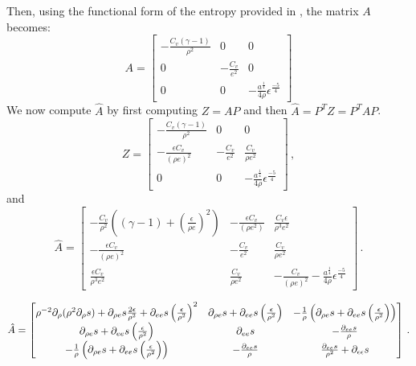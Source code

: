 \documentclass[times,doublespace]{fldauth}%
\begin{document}
%
Then, using the functional form of the entropy provided in , the matrix $A$ becomes:
%
\begin{equation}
A = 
\begin{bmatrix}
-\frac{C_v (\gamma-1)}{\rho^2} & 0 & 0 \\
0 & -\frac{C_v}{e^2} & 0 \\
0 & 0 & -\frac{a^\frac{1}{4}}{4\rho}\epsilon^\frac{-5}{4}
\end{bmatrix}
\end{equation}
%
We now compute $\hat{A}$ by first computing $Z=AP$ and then $\hat{A} = P^T Z = P^T A P$.
%
\begin{equation}
Z = 
\begin{bmatrix}
-\frac{C_v (\gamma-1)}{\rho^2} & 0 & 0 \\
-\frac{\epsilon C_v}{(\rho e)^2} & -\frac{C_v}{e^2} & \frac{C_v}{\rho e^2} \\
0 & 0 & -\frac{a^\frac{1}{4}}{4\rho}\epsilon^\frac{-5}{4}
\end{bmatrix} \, ,
\end{equation}
%
and 
%
\begin{equation}
\hat{A} = 
\begin{bmatrix}
-\frac{C_v}{\rho^2} \left((\gamma-1)+\left(\frac{\epsilon}{\rho e}\right)^2\right) & -\frac{\epsilon C_v}{(\rho e^2)} & \frac{C_v \epsilon}{\rho^3 e^2} \\
-\frac{\epsilon C_v}{(\rho e)^2} & -\frac{C_v}{e^2} & \frac{C_v}{\rho e^2} \\
\frac{\epsilon C_v}{\rho^3 e^2} & \frac{C_v}{\rho e^2} & -\frac{C_v}{(\rho e)^2}-\frac{a^\frac{1}{4}}{4\rho}\epsilon^\frac{-5}{4}
\end{bmatrix} \, .
\end{equation}

\textcolor{red}{
\begin{equation}\label{eq:gen-matrix}
\hat{A} = 
\begin{bmatrix}
\rho^{-2}\partial_{\rho}(\rho^2 \partial_{\rho} s) + \partial_{\rho e} s\frac{2 \epsilon}{\rho^2} + \partial_{e e} s \left(\frac{\epsilon}{\rho^2}\right)^2 &
\partial_{\rho e} s  + \partial_{e e} s \left(\frac{\epsilon}{\rho^2}\right) &
-\frac{1}{\rho} \left( \partial_{\rho e} s  + \partial_{e e} s \left(\frac{\epsilon}{\rho^2}\right) \right) \\
\partial_{\rho e} s  + \partial_{e e} s \left(\frac{\epsilon}{\rho^2}\right) &
\partial_{e e} s &
-\frac{\partial_{e e} s}{\rho} \\
-\frac{1}{\rho} \left( \partial_{\rho e} s  + \partial_{e e} s \left(\frac{\epsilon}{\rho^2}\right) \right) &
-\frac{\partial_{e e} s}{\rho} &
\frac{\partial_{e e} s}{\rho^2} + \partial_{\epsilon \epsilon} s
\end{bmatrix} \, .
\end{equation}
}
\end{document}
